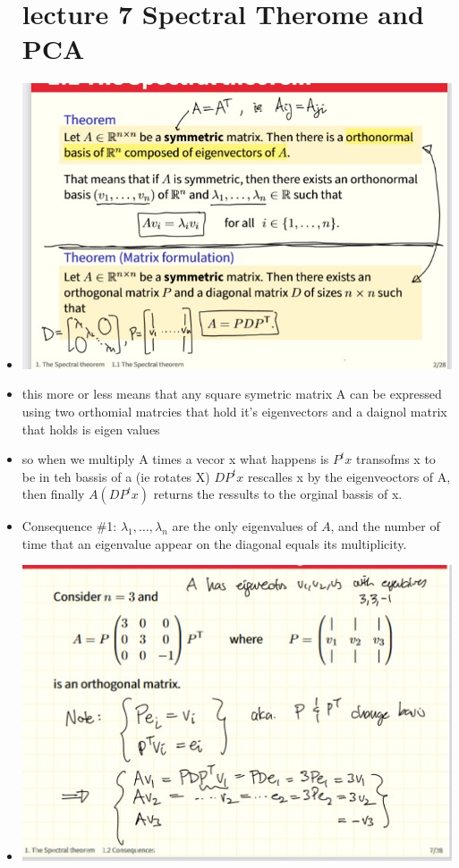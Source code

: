 \documentclass[12pt,twoside]{article}
\begin{document}
\begin{itemize}
\section{lecture 7 Spectral Therome  and PCA }
\item \includegraphics[width=15cm]{final Review/spectral.jpg}
\item this more or less means that any square symetric matrix A can be expressed using two orthomial matrcies that hold it's eigenvectors and a daignol matrix that holds is eigen values 
\item so when we multiply A times a vecor x what happens is $P^tx$ transofms x to be in teh bassis of a  (ie rotates X) $DP^tx$ rescalles x by the eigenveoctors of A, then finally $A(DP^tx)$ returns the ressults to the orginal bassis of x. 
\item Consequence \#1: $\lambda_1, \ldots, \lambda_n$ are the only eigenvalues of $A$, and the number of time that an eigenvalue appear on the diagonal equals its multiplicity.
\item \includegraphics[width=15cm]{final Review/spectral example.jpg}

\end{itemize}
\end{document}
